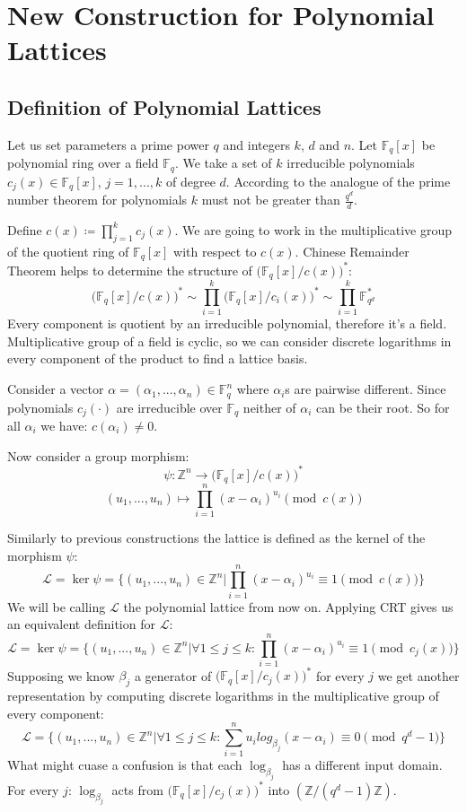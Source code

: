 \documentclass[12pt]{article}
\newcommand{\FF}{\mathbb{F}}
\newcommand{\ZZ}{\mathbb{Z}}
\newcommand{\LL}{\mathcal{L}}
\begin{document}
\section{New Construction for Polynomial Lattices}
\label{sec:polynomials}



\subsection{Definition of Polynomial Lattices}
\label{subsec:def_polynomials}


Let us set parameters a prime power $q$ and integers $k$, $d$ and $n$. Let $\FF_{q}[x]$ be polynomial ring over a field  $\FF_{q}$. We take a set of $k$ irreducible polynomials $c_{j}(x) \in \FF_{q}[x]$, $j =1, ...,k$ of degree $d$. According to the analogue of the prime number theorem for polynomials $k$ must not be greater than $\frac{q^d}{d}$.

Define $c(x) \coloneqq \prod_{j = 1}^{k} c_{j}(x)$. We are going to work in the multiplicative group of the quotient ring of  $\FF_{q}[x]$ with respect to $c(x)$.
Chinese Remainder Theorem helps to determine the structure of $\big(\FF_{q}[x]/c(x)\big)^{*}$:
\[
    \big(\FF_{q}[x]/c(x)\big)^{*} \sim \prod_{i=1}^{k}\big(\FF_{q}[x]/c_{i}(x)\big)^{*} \sim \prod_{i=1}^{k}\FF_{q^{d}}^*
\]
Every component is quotient by an irreducible polynomial, therefore it's a field. Multiplicative group of a field is cyclic, so we can consider discrete logarithms in every component of the product to find a lattice basis.

Consider a vector $\alpha = (\alpha_{1}, ... , \alpha_{n}) \in \FF_{q}^{n}$ where $\alpha_{i}$s are pairwise different. Since polynomials $c_{j}(\cdot)$ are irreducible over $\FF_{q}$ neither of $\alpha_{i}$ can be their root. So for all $\alpha_{i}$ we have: $c(\alpha_{i}) \neq 0$.

Now consider a group morphism:
\[
    \psi : \ZZ^{n} \rightarrow \big(\FF_{q}[x]/c(x)\big)^{*}
\]
\[
    (u_{1}, ..., u_{n}) \mapsto \prod_{i=1}^{n}(x - \alpha_{i})^{u_{i}} \pmod{c(x)}
\]

Similarly to previous constructions the lattice is defined as the kernel of the morphism $\psi$:
\[
    \LL = \ker \psi = \{(u_{1}, ..., u_{n}) \in \ZZ^{n} | \prod_{i=1}^{n}(x - \alpha_{i})^{u_{i}} \equiv 1 \pmod{c(x)}\}
\]
We will be calling $\LL$ the polynomial lattice from now on. Applying CRT gives us an equivalent definition for $\LL$:
\[
    \LL = \ker \psi = \{(u_{1}, ..., u_{n}) \in \ZZ^{n} |  \forall 1 \leq j \leq k: \prod_{i=1}^{n}(x - \alpha_{i})^{u_{i}} \equiv 1 \pmod{c_{j}(x)}\}
\]
Supposing we know $\beta_{j}$ a generator of $\big(\FF_{q}[x]/c_{j}(x)\big)^{*}$ for every $j$ we get another representation by computing discrete logarithms in the multiplicative group of every component:
\[
    \LL = \{(u_{1}, ..., u_{n}) \in \ZZ^{n} | \forall 1 \leq j \leq k: \sum_{i=1}^{n}u_{i}log_{\beta_{j}}(x - \alpha_{i}) \equiv 0 \pmod{q^{d} -1}\}
\]
What might cuase a confusion is that each $\log_{\beta_{j}}$ has a different input domain. For every $j$:  $\log_{\beta_{j}}$ acts from $\big(\FF_{q}[x]/c_{j}(x)\big)^{*}$ into $(\ZZ/(q^{d} - 1)\ZZ)$.
\end{document}
